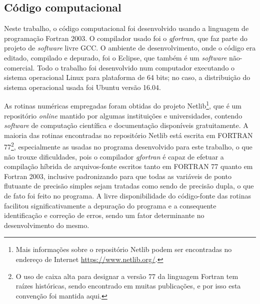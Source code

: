 \subsection{Código computacional}\label{sobre_o_programa}

Neste trabalho, o código computacional foi desenvolvido usando a linguagem de programação Fortran 2003. O compilador usado foi o \textit{gfortran}, que faz parte do projeto de \textit{software} livre GCC. O ambiente de desenvolvimento, onde o código era editado, compilado e depurado, foi o Eclipse, que também é um \textit{software} não-comercial. Todo o trabalho foi desenvolvido num computador executando o sistema operacional Linux para plataforma de 64 bits; no caso, a distribuição do sistema operacional usada foi Ubuntu versão 16.04.

As rotinas numéricas empregadas foram obtidas do projeto Netlib\footnote{Mais informações sobre o repositório Netlib podem ser encontradas no endereço de Internet \href{https://www.netlib.org/}{https://www.netlib.org/}.}, que é um repositório \textit{online} mantido por algumas instituições e universidades, contendo \textit{software} de computação científica e documentação disponíveis gratuitamente. A maioria das rotinas encontradas no repositório Netlib está escrita em FORTRAN 77\footnote{O uso de caixa alta para designar a versão 77 da linguagem Fortran tem raízes históricas, sendo encontrado em muitas publicações, e por isso esta convenção foi mantida aqui.}, especialmente as usadas no programa desenvolvido para este trabalho, o que não trouxe dificuldades, pois o compilador \textit{gfortran} é capaz de efetuar a compilação híbrida de arquivos-fonte escritos tanto em FORTRAN 77 quanto em Fortran 2003, inclusive padronizando para que todas as variáveis de ponto flutuante de precisão simples sejam tratadas como sendo de precisão dupla, o que de fato foi feito no programa.
A livre disponibilidade do código-fonte das rotinas facilitou significativamente a depuração do programa e a consequente identificação e correção de erros, sendo um fator determinante no desenvolvimento do mesmo. 

